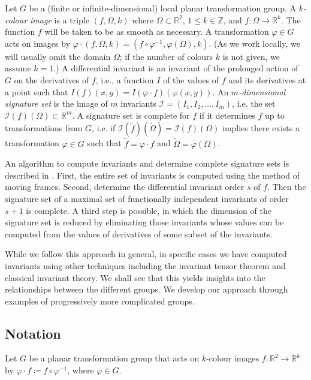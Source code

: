 \documentclass{article}
\def\R{\mathbb{R}}
\begin{document}
Let $G$ be a (finite or infinite-dimensional) local planar transformation group. 
A {\em $k$-colour image} is a triple $(f,\Omega,k)$ where $\Omega\subset\R^2$, $1\le k\in\mathbb{Z}$,
and $f\colon\Omega\to\R^k$. The function $f$ will be taken to be as smooth as necessary.
A transformation $\varphi\in G$ acts on images by $\varphi\cdot (f,\Omega,k) = (f\circ\varphi^{-1},\varphi(\Omega),k)$.
(As we work locally, we will usually omit the domain $\Omega$; if the number of colours $k$ is not given, we assume $k=1$.)  A differential invariant is an invariant of the prolonged action of $G$ on the derivatives of $f$, i.e., a function $I$ of the values of $f$ and its derivatives at a point such that $I(f)(x,y) = I(\varphi\cdot f)(\varphi(x,y))$. An {\em $m$-dimensional signature set} is the image of $m$ invariants $\mathcal{I}=(I_1,I_2,\dots,I_m)$, i.e. the
set $\mathcal{I}(f)(\Omega)\subset \mathbb{R}^m$. 
A signature set is complete for $f$ if it determines $f$ up to transformations from $G$, i.e. if $\mathcal{I}(\tilde f)(\tilde\Omega) = \mathcal{I}(f)(\Omega)$ implies there exists a transformation $\varphi\in G$ such that $\tilde f = \varphi\cdot f$ and $\tilde \Omega = \varphi(\Omega)$.

An algorithm to compute invariants and determine complete signature sets is described in \cite{olver2001}. First, the
entire set of invariants is computed using the method of moving frames. Second, determine the differential invariant order $s$ of $f$. Then the signature set of a maximal set of functionally independent invariants of order $s+1$ is complete. A third step is possible, in which the dimension of the signature set is reduced by eliminating those invariants whose values can be computed from the values of derivatives of some subset of the invariants. 

While we follow this approach in general, in specific cases we have computed invariants using other techniques
including the invariant tensor theorem and classical invariant theory. We shall see that this yields insights into the relationships between the different groups. We develop our approach through examples of progressively more complicated groups.

\subsection{Notation}
Let $G$ be a planar transformation group that acts on $k$-colour images $f
\colon \mathbb{R}^2 \rightarrow \mathbb{R}^k$ by $\varphi \cdot f \coloneqq
f \circ \varphi^{-1}$, where $\varphi \in G$.
\end{document}
